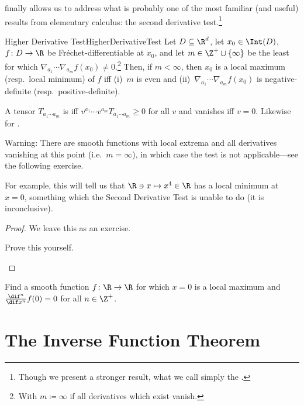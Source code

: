  finally allows us to address what is probably one of the most familiar (and useful) results from elementary calculus:  the second derivative test.\footnote{Though we present a stronger result, what we call simply the .}
\begin{thm}{Higher Derivative Test}{HigherDerivativeTest}
Let $D\subseteq \R ^d$, let $x_0\in \Int (D)$, $f\colon D\rightarrow \R$ be Fréchet-differentiable at $x_0$, and let $m\in \Z ^+\cup \{ \infty \}$ be the least for which $\nabla _{a_1}\cdots \nabla _{a_m}f(x_0)\neq 0$.\footnote{With $m\coloneqq \infty$ if all derivatives which exist vanish.}  Then, if $m<\infty$, then $x_0$ is a local maximum (resp.~local minimum) of $f$ iff (i)~$m$ is even and (ii)~$\nabla _{a_1}\cdots \nabla _{a_m}f(x_0)$ is negative-definite (resp.~positive-definite).
\begin{rmk}
	A tensor $T_{a_1\cdots a_m}$ is  iff $v^{a_1}\cdots v^{a_m}T_{a_1\cdots a_m}\geq 0$ for all $v$ and vanishes iff $v=0$.  Likewise for .
\end{rmk}
\begin{wrn}
Warning:  There are smooth functions with local extrema and all derivatives vanishing at this point (i.e.~$m=\infty$), in which case the test is not applicable---see the following exercise.
\end{wrn}
\begin{rmk}
For example, this will tell us that $\R \ni x\mapsto x^4\in \R$ has a local minimum at $x=0$, something which the Second Derivative Test is unable to do (it is inconclusive).
\end{rmk}
\begin{proof}
We leave this as an exercise.
\begin{exr}[breakable=false]{}{}
Prove this yourself.
\end{exr}
\end{proof}
\end{thm}
\begin{exr}{}{}
Find a smooth function $f\colon \R \rightarrow \R$ for which $x=0$ is a local maximum and $\frac{\dif ^n}{\dif x^n}f(0)=0$ for all $n\in \Z ^+$.
\end{exr}

\section{The Inverse Function Theorem}

